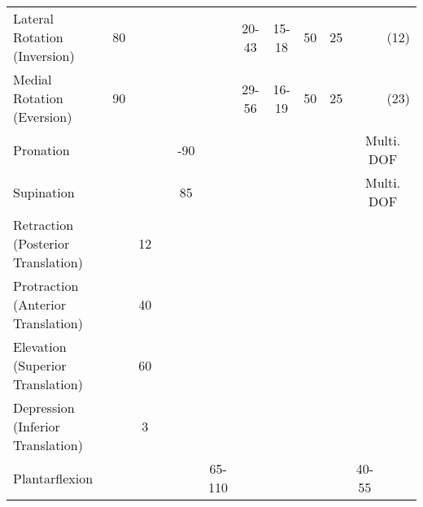 \begin{sidewaystable}
{\begin{tabular}{l c c c c c c c c c c c}
			Lateral Rotation (Inversion)         & 80\textdegree         & \textendash     & \textendash & \textendash      & \textendash           & 20-43\textdegree                & 15-18\textdegree                & 50\textdegree         & 25\textdegree                   & \textendash & (12\textdegree)            \\
			Medial Rotation (Eversion)           & 90\textdegree         & \textendash     & \textendash & \textendash      & \textendash           & 29-56\textdegree                & 16-19\textdegree                & 50\textdegree         & 25\textdegree                   & \textendash & (23\textdegree)            \\
			Pronation                            & \textendash & \textendash     & \textendash & -90\textdegree             & \textendash           & \textendash           & \textendash           & \textendash & \textendash           & \multicolumn{2}{c}{Multi. DOF} \\
			Supination                           & \textendash & \textendash     & \textendash & 85\textdegree              & \textendash           & \textendash           & \textendash           & \textendash & \textendash           & \multicolumn{2}{c}{Multi. DOF} \\
			Retraction (Posterior Translation)   & \textendash & 12\textdegree             & \textendash & \textendash      & \textendash           & \textasteriskcentered & \textasteriskcentered & \textendash & \textasteriskcentered & \textendash & \textendash      \\
			Protraction (Anterior Translation)   & \textendash & 40\textdegree             & \textendash & \textendash      & \textendash           & \textasteriskcentered & \textasteriskcentered & \textendash & \textasteriskcentered & \textendash & \textendash      \\
			Elevation (Superior Translation)     & \textendash & 60\textdegree             & \textendash & \textendash      & \textendash           & \textasteriskcentered & \textasteriskcentered & \textendash & \textasteriskcentered & \textendash & \textendash      \\
			Depression (Inferior Translation)    & \textendash & 3\textdegree              & \textendash & \textendash      & \textendash           & \textasteriskcentered & \textasteriskcentered & \textendash & \textasteriskcentered & \textendash & \textendash      \\
			Plantarflexion                       & \textendash & \textendash     & \textendash & \textendash      & 65-110\textdegree               & \textendash           & \textendash           & \textendash & \textendash           & 40-55\textdegree      & \textendash      \\

\end{tabular}}
\end{sidewaystable}

